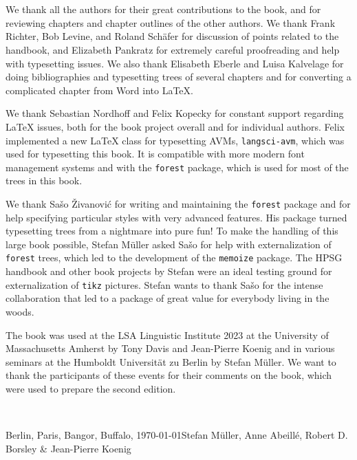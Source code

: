 \chapter{\acknowledgmentsUS}

\begin{refsection}


We thank all the authors for their great contributions to the book, and for
reviewing chapters and chapter outlines of the other authors. We thank
Frank Richter, Bob Levine, and Roland Schäfer for discussion of points related to the handbook, and
Elizabeth Pankratz for extremely careful proofreading and help with typesetting issues. We also
thank Elisabeth Eberle and Luisa Kalvelage for doing bibliographies and typesetting trees of several
chapters and for converting a complicated chapter from Word into \LaTeX.

We thank Sebastian Nordhoff and Felix Kopecky for constant support regarding \LaTeX{} issues, both for
the book project overall and for individual authors. Felix implemented a new \LaTeX{} class for
typesetting AVMs, \texttt{langsci-avm}, which was used for typesetting this book. It is compatible with more
modern font management systems and with the \texttt{forest} package, which is used for most of the trees in this book.

We thank Sašo Živanović for writing and maintaining the \texttt{forest} package and for help
specifying particular styles with very advanced features. His package turned typesetting trees from a
nightmare into pure fun! To make the handling of this large book possible, Stefan Müller asked Sašo
for help with externalization of \texttt{forest} trees, which led to the development of
the \texttt{memoize} package. The HPSG handbook and other book projects by Stefan were an
ideal testing ground for externalization of \texttt{tikz} pictures. Stefan wants to thank
Sašo for the intense collaboration that led to a package of great value for everybody
living in the woods.


The book was used at the LSA Linguistic Institute 2023 at the University of Massachusetts Amherst by
Tony Davis and Jean-Pierre Koenig and in various seminars at the Humboldt
Universität zu Berlin by Stefan Müller. We want to thank the participants of these events for their
comments on the book, which were used to prepare the second edition.

~\medskip

\noindent
Berlin, Paris, Bangor, Buffalo, \today\hfill Stefan Müller, Anne Abeillé, Robert D. Borsley \& Jean-​Pierre Koenig






\end{refsection}

